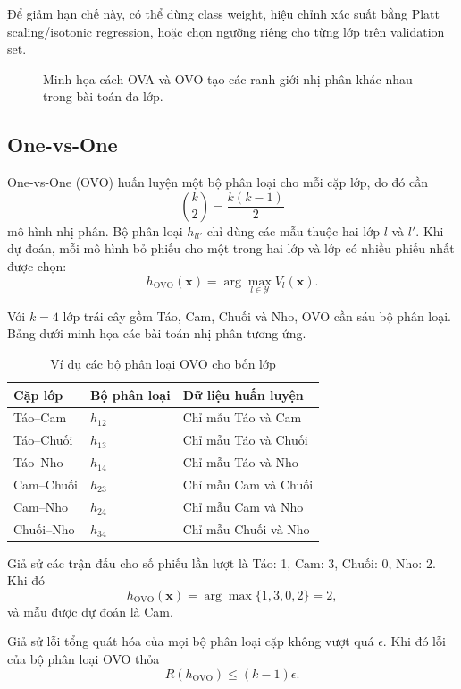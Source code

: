 Để giảm hạn chế này, có thể dùng class weight, hiệu chỉnh xác suất bằng Platt scaling/isotonic regression, hoặc chọn ngưỡng riêng cho từng lớp trên validation set.
\begin{figure}[H]
\centering
\resizebox{0.98\textwidth}{!}{}
\caption{Minh họa cách OVA và OVO tạo các ranh giới nhị phân khác nhau trong bài toán đa lớp.}
\label{fig:ova-ovo-boundaries}
\end{figure}


\subsection{One-vs-One}

One-vs-One (OVO) huấn luyện một bộ phân loại cho mỗi cặp lớp, do đó cần
\[
  \binom{k}{2}=\frac{k(k-1)}{2}
\]
mô hình nhị phân. Bộ phân loại $h_{ll'}$ chỉ dùng các mẫu thuộc hai lớp $l$ và $l'$. Khi dự đoán, mỗi mô hình bỏ phiếu cho một trong hai lớp và lớp có nhiều phiếu nhất được chọn:
\[
  h_{\text{OVO}}(\bm{x})=\arg\max_{l\in\mathcal{Y}}V_l(\bm{x}).
\]

Với $k=4$ lớp trái cây gồm Táo, Cam, Chuối và Nho, OVO cần sáu bộ phân loại. Bảng dưới minh họa các bài toán nhị phân tương ứng.

\begin{table}[H]
\centering
\caption{Ví dụ các bộ phân loại OVO cho bốn lớp}
\begin{tabular}{lll}
\toprule
\textbf{Cặp lớp} & \textbf{Bộ phân loại} & \textbf{Dữ liệu huấn luyện} \\
\midrule
Táo--Cam & $h_{12}$ & Chỉ mẫu Táo và Cam \\
Táo--Chuối & $h_{13}$ & Chỉ mẫu Táo và Chuối \\
Táo--Nho & $h_{14}$ & Chỉ mẫu Táo và Nho \\
Cam--Chuối & $h_{23}$ & Chỉ mẫu Cam và Chuối \\
Cam--Nho & $h_{24}$ & Chỉ mẫu Cam và Nho \\
Chuối--Nho & $h_{34}$ & Chỉ mẫu Chuối và Nho \\
\bottomrule
\end{tabular}
\end{table}

Giả sử các trận đấu cho số phiếu lần lượt là Táo: 1, Cam: 3, Chuối: 0, Nho: 2. Khi đó
\[
  h_{\text{OVO}}(\bm{x})=\arg\max\{1,3,0,2\}=2,
\]
và mẫu được dự đoán là Cam.

\begin{proposition}
Giả sử lỗi tổng quát hóa của mọi bộ phân loại cặp không vượt quá $\epsilon$. Khi đó lỗi của bộ phân loại OVO thỏa
\[
  R(h_{\text{OVO}})\leq (k-1)\epsilon.
\]
\end{proposition}

